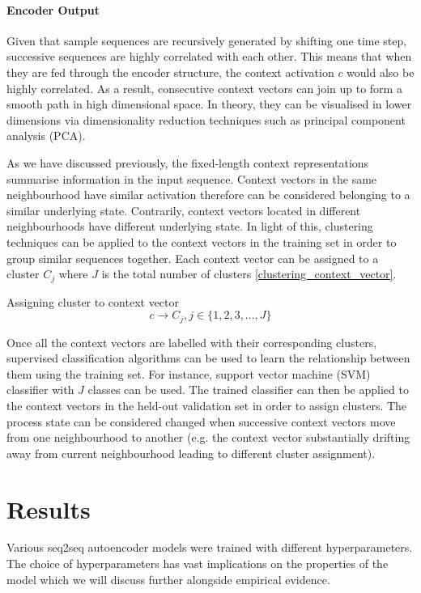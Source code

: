 \documentclass[11pt]{article} %
\theoremstyle{plain}
\theoremstyle{definition}
\begin{document}
\paragraph{Encoder Output} 

Given that sample sequences are recursively generated by shifting one time step, successive sequences are highly correlated with each other. This means that when they are fed through the encoder structure, the context activation \(c\) would also be highly correlated. As a result, consecutive context vectors can join up to form a smooth path in high dimensional space. In theory, they can be visualised in lower dimensions via dimensionality reduction techniques such as principal component analysis (PCA).

As we have discussed previously, the fixed-length context representations summarise information in the input sequence. Context vectors in the same neighbourhood have similar activation therefore can be considered belonging to a similar underlying state. Contrarily, context vectors located in different neighbourhoods have different underlying state. In light of this, clustering techniques can be applied to the context vectors in the training set in order to group similar sequences together. Each context vector can be assigned to a cluster \(C_j\) where \(J\) is the total number of clusters \eqref{clustering_context_vector}. 

Assigning cluster to context vector
\begin{equation}
\label{clustering_context_vector}
c \rightarrow C_j , j\in \{1,2,3,...,J\}
\end{equation}

Once all the context vectors are labelled with their corresponding clusters, supervised classification algorithms can be used to learn the relationship between them using the training set. For instance, support vector machine (SVM) classifier with \(J\) classes can be used. The trained classifier can then be applied to the context vectors in the held-out validation set in order to assign clusters. The process state can be considered changed when successive context vectors move from one neighbourhood to another (e.g. the context vector substantially drifting away from current neighbourhood leading to different cluster assignment).

\newpage

\section{Results}
Various seq2seq autoencoder models were trained with different hyperparameters. The choice of hyperparameters has vast implications on the properties of the model which we will discuss further alongside empirical evidence.
\end{document}
